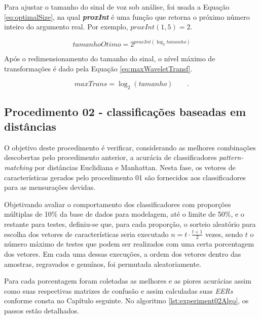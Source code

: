 		\par Para ajustar o tamanho do sinal de voz sob análise, foi usada a Equação \ref{eq:optimalSize}, na qual \textit{\textbf{proxInt}} é uma função que retorna o próximo número inteiro do argumento real. Por exemplo, $proxInt(1,5) = 2$.

		\begin{equation}
					tamanhoOtimo=2^{proxInt(\log_{2}tamanho)}
					\label{eq:optimalSize}
		\end{equation} 
		
		\par Após o redimensionamento do tamanho do sinal, o nível máximo de transformações é dado pela Equação \ref{eq:maxWaveletTransf}. 
				
		\begin{equation}
					maxTrans=\log_{2}(tamanho) \qquad.
					\label{eq:maxWaveletTransf}
		\end{equation}
		
		\subsection{Procedimento 02 - classificações baseadas em distâncias}
		\label{chap:propApproach:sec:Experimento02}
		\par O objetivo deste procedimento é verificar, considerando as melhores combinações descobertas pelo procedimento anterior, a acurácia de classificadores \textit{pattern-matching} por distâncias Euclidiana e Manhattan. Nesta fase, os vetores de características gerados pelo procedimento 01 são fornecidos aos classificadores para as mensurações devidas.
				
		\par Objetivando avaliar o comportamento dos classificadores com proporções múltiplas de 10\% da base de dados para modelagem, até o limite de 50\%, e o restante para testes, definiu-se que, para cada proporção, o sorteio aleatório para escolha dos vetores de características seria executado $n=t \cdot \frac{t+1}{2}$ vezes, sendo $t$ o número máximo de testes que podem ser realizados com uma certa porcentagem dos vetores. Em cada uma dessas execuções, a ordem dos vetores dentro das amostras, regravados e genuínos, foi permutada aleatoriamente.
				
		\par Para cada porcentagem foram coletadas as melhores e as piores acurácias assim como suas respectivas matrizes de confusão e assim calculadas suas \textit{EERs} conforme consta no Capítulo seguinte. No algoritmo \ref{lst:experiment02Algo}, os passos estão detalhados.
		
